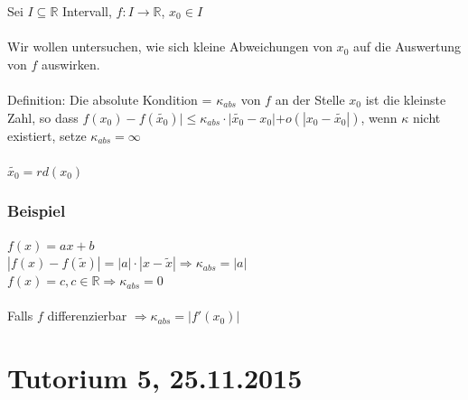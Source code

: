 \documentclass{llncs}
\begin{document}
Sei $I \subseteq \mathbb{R}$ Intervall, $f:I \rightarrow \mathbb{R}$, $x_0 \in I$\\
\\
Wir wollen untersuchen, wie sich kleine Abweichungen von $x_0$ auf die Auswertung von $f$ auswirken.\\
\\
Definition: Die absolute Kondition = $\kappa_{abs}$ von $f$ an der Stelle $x_0$ ist die kleinste Zahl, so dass $f(x_0) - f(\tilde{x_0})| \leq \kappa_{abs} \cdot |\tilde{x_0}-x_0| + o(|x_0 - \tilde{x_0}|)$, wenn $\kappa$ nicht existiert, setze $\kappa_{abs} = \infty$\\
\\
$\tilde{x_0} = rd(x_0)$

\subsection*{Beispiel}

$f(x) = ax+b$\\
$|f(x)-f(\tilde{x})| = |a| \cdot |x-\tilde{x}| \Rightarrow \kappa_{abs} = |a|$\\
$f(x) = c, c \in \mathbb{R} \Rightarrow \kappa_{abs} = 0$\\
\\
Falls $f$ differenzierbar $\Rightarrow \kappa_{abs} = | f'(x_0)|$

\chapter*{Tutorium 5, 25.11.2015}
\end{document}
